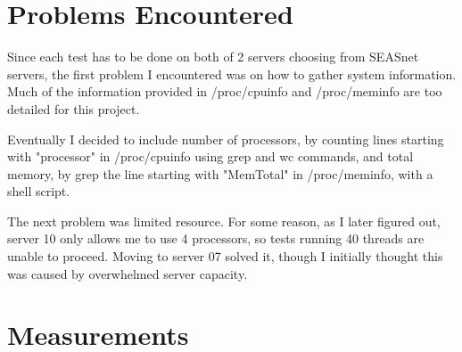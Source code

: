\documentclass[letterpaper,twocolumn,10pt]{article}
\begin{document}
\section{Problems Encountered}

Since each test has to be done on both of 2 servers choosing from SEASnet servers, the first problem I encountered was on how to gather system information.
Much of the information provided in /proc/cpuinfo and /proc/meminfo are too detailed for this project. 

Eventually I decided to include number of processors, by counting lines starting with "processor" in /proc/cpuinfo using grep and wc commands, 
and total memory, by grep the line starting with "MemTotal" in /proc/meminfo, with a shell script.

The next problem was limited resource. For some reason, as I later figured out, server 10 only allows me to use 4 processors, so tests running 40 threads are unable to proceed.
Moving to server 07 solved it, though I initially thought this was caused by overwhelmed server capacity.

\section{Measurements}
\end{document}
